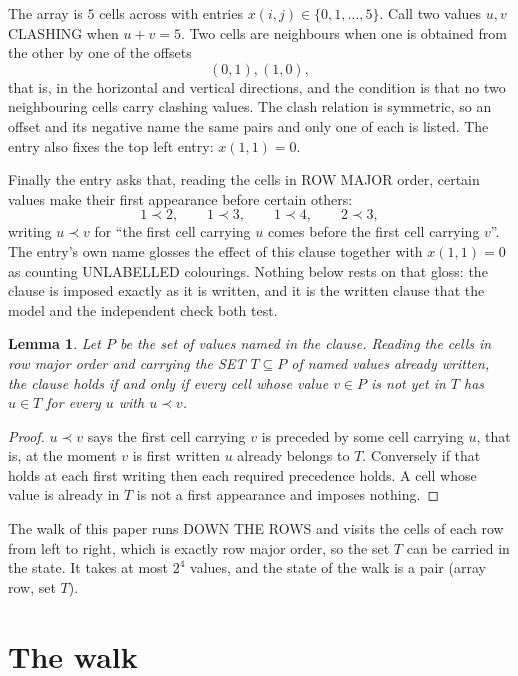 \documentclass[11pt,a4paper]{article}
\theoremstyle{plain}
\newtheorem{lemma}[theorem]{Lemma}
\theoremstyle{definition}
\begin{document}
The array is $5$ cells across with entries $x(i,j)\in\{0,1,\dots,5\}$. Call two values $u,v$ CLASHING
when $u+v=5$. Two cells are neighbours when one is obtained from the other by one of
the offsets
\[
(0,1), (1,0),
\]
that is, in the horizontal and vertical directions, and the condition is that no two neighbouring cells carry
clashing values. The clash relation is symmetric, so an offset and its negative name the
same pairs and only one of each is listed. The entry also fixes the top left entry: $x(1,1)=0$.

Finally the entry asks that, reading the cells in ROW MAJOR order, certain values make their
first appearance before certain others:
\[
1\prec 2,\qquad 1\prec 3,\qquad 1\prec 4,\qquad 2\prec 3 ,
\]
writing $u\prec v$ for ``the first cell carrying $u$ comes before the first cell carrying
$v$''. The entry's own name glosses the effect of this clause together with $x(1,1)=0$ as
counting UNLABELLED colourings. Nothing below rests on that gloss: the clause is imposed
exactly as it is written, and it is the written clause that the model and the independent
check both test.

\begin{lemma}\label{lem:seen}
Let $P$ be the set of values named in the clause. Reading the cells in row major order and
carrying the SET $T\subseteq P$ of named values already written, the clause holds if and only
if every cell whose value $v\in P$ is not yet in $T$ has $u\in T$ for every $u$ with $u\prec v$.
\end{lemma}

\begin{proof}
$u\prec v$ says the first cell carrying $v$ is preceded by some cell carrying $u$, that is, at
the moment $v$ is first written $u$ already belongs to $T$. Conversely if that holds at each
first writing then each required precedence holds. A cell whose value is already in $T$ is not
a first appearance and imposes nothing.
\end{proof}

The walk of this paper runs DOWN THE ROWS and visits the cells of each row from left to right,
which is exactly row major order, so the set $T$ can be carried in the state. It takes at most
$2^{4}$ values, and the state of the walk is a pair (array row, set $T$).

\section{The walk}
\end{document}
